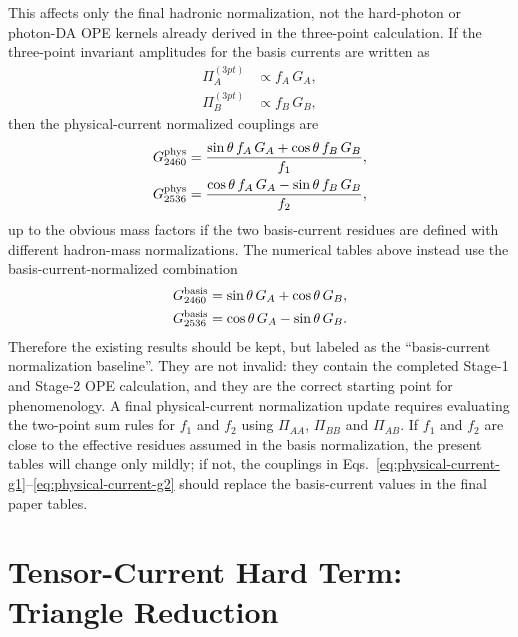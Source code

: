 \documentclass[11pt]{article}
\begin{document}
This affects only the final hadronic normalization, not the hard-photon or
photon-DA OPE kernels already derived in the three-point calculation.  If the
three-point invariant amplitudes for the basis currents are written as
\begin{align}
  \Pi_A^{(3pt)} &\propto f_A\,G_A,\\
  \Pi_B^{(3pt)} &\propto f_B\,G_B,
\end{align}
then the physical-current normalized couplings are
\begin{align}
  G_{2460}^{\rm phys}
  &=
  \frac{\sin\theta\,f_A\,G_A+\cos\theta\,f_B\,G_B}{f_1},
  \label{eq:physical-current-g1}\\
  G_{2536}^{\rm phys}
  &=
  \frac{\cos\theta\,f_A\,G_A-\sin\theta\,f_B\,G_B}{f_2},
  \label{eq:physical-current-g2}
\end{align}
up to the obvious mass factors if the two basis-current residues are defined
with different hadron-mass normalizations.  The numerical tables above instead
use the basis-current-normalized combination
\begin{align}
  G_{2460}^{\rm basis}
  &= \sin\theta\,G_A+\cos\theta\,G_B,\\
  G_{2536}^{\rm basis}
  &= \cos\theta\,G_A-\sin\theta\,G_B.
\end{align}
Therefore the existing results should be kept, but labeled as the
``basis-current normalization baseline''.  They are not invalid: they contain
the completed Stage-1 and Stage-2 OPE calculation, and they are the correct
starting point for phenomenology.  A final physical-current normalization
update requires evaluating the two-point sum rules for $f_1$ and $f_2$ using
$\Pi_{AA}$, $\Pi_{BB}$ and $\Pi_{AB}$.  If $f_1$ and $f_2$ are close to the
effective residues assumed in the basis normalization, the present tables will
change only mildly; if not, the couplings in
Eqs.~\eqref{eq:physical-current-g1}--\eqref{eq:physical-current-g2} should
replace the basis-current values in the final paper tables.

\section{Tensor-Current Hard Term: Triangle Reduction}
\end{document}
